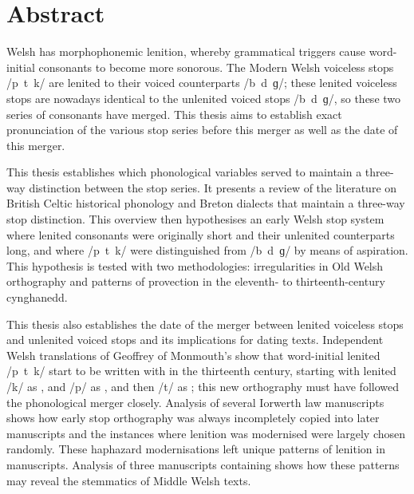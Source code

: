 \chapter*{Abstract}%
\label{cha:abstract}

Welsh has morphophonemic lenition, whereby grammatical triggers cause word-initial consonants to become more sonorous. The Modern Welsh voiceless stops /p~t~k/ are lenited to their voiced counterparts /b~d~ɡ/; these lenited voiceless stops are nowadays identical to the unlenited voiced stops /b~d~ɡ/, so these two series of consonants have merged. This thesis aims to establish exact pronunciation of the various stop series before this merger as well as the date of this merger. 

This thesis establishes which phonological variables served to maintain a three-way  distinction between the stop series. It presents a review of the literature on British Celtic historical phonology and Breton dialects that maintain a three-way stop distinction. This overview then hypothesises an early Welsh stop system where lenited consonants were originally short and their unlenited counterparts long, and where /p~t~k/ were distinguished from /b~d~ɡ/ by means of aspiration. This hypothesis is tested with two methodologies: irregularities in Old Welsh orthography and patterns of provection in the eleventh- to thirteenth-century cynghanedd.

This thesis also establishes the date of the merger between lenited voiceless stops and unlenited voiced stops and its implications for dating texts. Independent Welsh translations of Geoffrey of Monmouth’s  show that word-initial lenited /p~t~k/ start to be written with  in the thirteenth century, starting with lenited /k/ as , and /p/ as , and then /t/ as ; this new orthography must have followed the phonological merger closely. Analysis of several Iorwerth law manuscripts shows how early stop orthography was always incompletely copied into later manuscripts and the instances  where lenition was modernised were largely chosen randomly. These haphazard modernisations left unique patterns of lenition in manuscripts. Analysis of three manuscripts containing  shows how these patterns may reveal the stemmatics of Middle Welsh texts.


